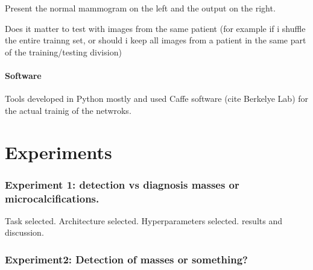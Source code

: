\documentclass[11pt]{article}
\begin{document}
	Present the normal mammogram on the left and the output on the right.

	Does it matter to test with images from the same patient (for example if i shuffle the entire trainng set, or should i keep all images from a patient in the same part of the training/testing division)

	\subsection{Software}
	Tools developed in Python mostly and used Caffe software (cite Berkelye Lab) for the actual trainig of the netwroks. 
	

	\part{Experiments}
	\section{Experiment 1: detection vs diagnosis masses or microcalcifications.}

	Task selected. Architecture selected. Hyperparameters selected. results and discussion.
	\section{Experiment2: Detection of masses or something?}
	

	
	
	
\end{document}
